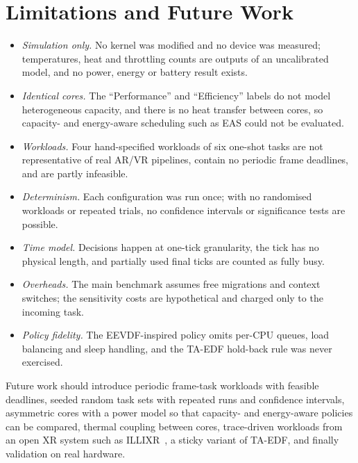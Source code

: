 \documentclass[conference]{IEEEtran}
\begin{document}
\section{Limitations and Future Work}\label{sec:limits}
\begin{itemize}
\item \emph{Simulation only.} No kernel was modified and no device was measured; temperatures, heat and throttling counts are outputs of an uncalibrated model, and no power, energy or battery result exists.
\item \emph{Identical cores.} The ``Performance'' and ``Efficiency'' labels do not model heterogeneous capacity, and there is no heat transfer between cores, so capacity- and energy-aware scheduling such as EAS could not be evaluated.
\item \emph{Workloads.} Four hand-specified workloads of six one-shot tasks are not representative of real AR/VR pipelines, contain no periodic frame deadlines, and are partly infeasible.
\item \emph{Determinism.} Each configuration was run once; with no randomised workloads or repeated trials, no confidence intervals or significance tests are possible.
\item \emph{Time model.} Decisions happen at one-tick granularity, the tick has no physical length, and partially used final ticks are counted as fully busy.
\item \emph{Overheads.} The main benchmark assumes free migrations and context switches; the sensitivity costs are hypothetical and charged only to the incoming task.
\item \emph{Policy fidelity.} The EEVDF-inspired policy omits per-CPU queues, load balancing and sleep handling, and the TA-EDF hold-back rule was never exercised.
\end{itemize}

Future work should introduce periodic frame-task workloads with feasible deadlines, seeded random task sets with repeated runs and confidence intervals, asymmetric cores with a power model so that capacity- and energy-aware policies can be compared, thermal coupling between cores, trace-driven workloads from an open XR system such as ILLIXR~\cite{huzaifa2021}, a sticky variant of TA-EDF, and finally validation on real hardware.
\end{document}

